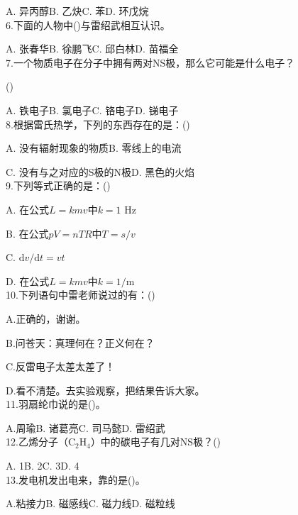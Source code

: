 \documentclass[UTF8,12pt,oneside]{ctexbook}
\begin{document}
    A. 异丙醇\qquad B. 乙炔\qquad C. 苯\qquad D. 环戊烷
    ~\\
    
    6.下面的人物中(\qquad)与雷绍武相互认识。
    
    A. 张春华\qquad B. 徐鹏飞\qquad C. 邱白林\qquad D. 苗福全
    ~\\
    
    7.一个物质电子在分子中拥有两对NS极，那么它可能是什么电子？
    
    \hfill{(\qquad)}
    
    A. 铁电子\qquad B. 氯电子\qquad C. 铬电子\qquad D. 锑电子
    ~\\
    
    8.根据雷氏热学，下列的东西存在的是：(\qquad)
    
    A. 没有辐射现象的物质\qquad B. 零线上的电流
    
    C. 没有与之对应的S极的N极\qquad D. 黑色的火焰
    ~\\
    
    9.下列等式正确的是：(\qquad)
    
    A. 在公式$L=kmv$中$k=1$ Hz
    
    B. 在公式$pV=nTR$中$T=s/v$
    
    C. $\mathrm{d}v/\mathrm{d}t=vt$
    
    D. 在公式$L=kmv$中$k=1/$m
    ~\\
    
    10.下列语句中雷老师说过的有：(\qquad)
    
    A.正确的，谢谢。
    
    B.问苍天：真理何在？正义何在？
    
    C.反雷电子太差太差了！
    
    D.看不清楚。去实验观察，把结果告诉大家。
    ~\\
    
    11.羽扇纶巾说的是(\qquad)。
    
    A.周瑜\qquad B. 诸葛亮\qquad C. 司马懿\qquad D. 雷绍武
    ~\\
    
    12.乙烯分子（C$_2$H$_4$）中的碳电子有几对NS极？(\qquad)
    
    A. 1\qquad B. 2\qquad C. 3\qquad D. 4
    ~\\
    
    13.发电机发出电来，靠的是(\qquad)。
    
    A.粘接力\qquad B. 磁感线\qquad C. 磁力线\qquad D. 磁粒线
    ~\\
    
\end{document}
